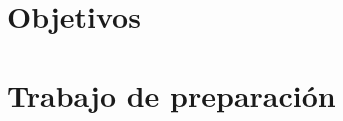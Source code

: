 \documentclass{article}
\begin{document}

\tableofcontents
\newpage

\section{Objetivos}




% 

\section{Trabajo de preparación}



\FloatBarrier

\end{document}
